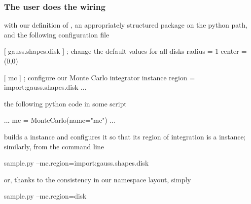 \begin{frame}[fragile]
%
  \frametitle{The user does the wiring}
%
  with our definition of , an appropriately structured package
   on the python path, and the following configuration file
%
  \begin{icfg}{}
 [ gauss.shapes.disk ] ; change the default values for all disks
 radius = 1
 center = (0,0)

 [ mc ] ; configure our Monte Carlo integrator instance
 region = import:gauss.shapes.disk
 ...
  \end{icfg}{}
%
 the following python code in some script 
%
 \begin{ipython}{}
   ...
   mc = MonteCarlo(name="mc")
   ...
 \end{ipython}
%
 builds a  instance and configures it so that its region of
 integration is a  instance; similarly, from the command line
%
 \begin{ish}{}
    sample.py --mc.region=import:gauss.shapes.disk
 \end{ish}
%
 or, thanks to the consistency in our namespace layout, simply
%
 \begin{ish}{}
    sample.py --mc.region=disk
 \end{ish}
%
\end{frame}

